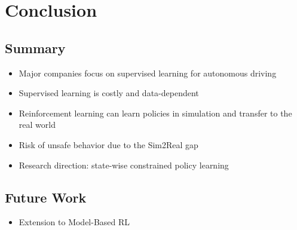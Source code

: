 \documentclass[8pt, aspectratio=169]{beamer} %
\begin{document}


\section{Conclusion}

\subsection{Summary}

\begin{frame}{\insertsubsectionhead}

  \begin{itemize}
    \item <2-> Major companies focus on supervised learning for autonomous driving
    \item <3-> Supervised learning is costly and data-dependent
    \item <4-> Reinforcement learning can learn policies in simulation and transfer to the real world
    \item <5-> Risk of unsafe behavior due to the Sim2Real gap
    \item <6-> Research direction: state-wise constrained policy learning
  \end{itemize}

  \vspace{0.5cm}


\end{frame}


\subsection{Future Work}

\begin{frame}{\insertsubsectionhead}

  \begin{itemize}
    \item <2-> Extension to Model-Based RL
  \end{itemize}

\end{frame}
\end{document}
